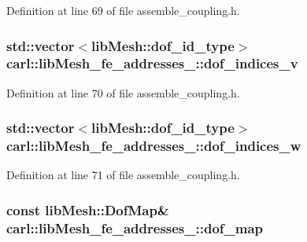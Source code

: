 Definition at line 69 of file assemble\+\_\+coupling.\+h.

\hypertarget{classcarl_1_1lib_mesh__fe__addresses__3_afc4eda615f6af70d704974b4af3dc25e}{}
\subsubsection[{dof\+\_\+indices\+\_\+v}]{\setlength{\rightskip}{0pt plus 5cm}std\+::vector$<$lib\+Mesh\+::dof\+\_\+id\+\_\+type$>$ carl\+::lib\+Mesh\+\_\+fe\+\_\+addresses\+\_\+::dof\+\_\+indices\+\_\+v}\label{classcarl_1_1lib_mesh__fe__addresses__3_afc4eda615f6af70d704974b4af3dc25e}


Definition at line 70 of file assemble\+\_\+coupling.\+h.

\hypertarget{classcarl_1_1lib_mesh__fe__addresses__3_ac7668338feadf63c7a02e57255888167}{}
\subsubsection[{dof\+\_\+indices\+\_\+w}]{\setlength{\rightskip}{0pt plus 5cm}std\+::vector$<$lib\+Mesh\+::dof\+\_\+id\+\_\+type$>$ carl\+::lib\+Mesh\+\_\+fe\+\_\+addresses\+\_\+::dof\+\_\+indices\+\_\+w}\label{classcarl_1_1lib_mesh__fe__addresses__3_ac7668338feadf63c7a02e57255888167}


Definition at line 71 of file assemble\+\_\+coupling.\+h.

\hypertarget{classcarl_1_1lib_mesh__fe__addresses__3_a08da73b64b37fc9b3059924591db2948}{}
\subsubsection[{dof\+\_\+map}]{\setlength{\rightskip}{0pt plus 5cm}const lib\+Mesh\+::\+Dof\+Map\& carl\+::lib\+Mesh\+\_\+fe\+\_\+addresses\+\_\+::dof\+\_\+map}\label{classcarl_1_1lib_mesh__fe__addresses__3_a08da73b64b37fc9b3059924591db2948}


